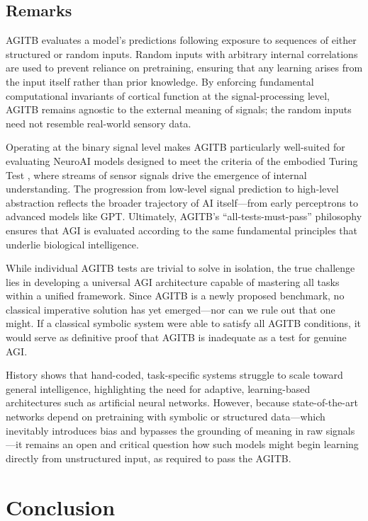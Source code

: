 \documentclass{article}
\begin{document}
\subsection{Remarks}

AGITB evaluates a model’s predictions following exposure to sequences of either structured or random inputs. Random inputs with arbitrary internal correlations are used to prevent reliance on pretraining, ensuring that any learning arises from the input itself rather than prior knowledge. By enforcing fundamental computational invariants of cortical function at the signal-processing level, AGITB remains agnostic to the external meaning of signals; the random inputs need not resemble real-world sensory data.

Operating at the binary signal level makes AGITB particularly well-suited for evaluating NeuroAI models designed to meet the criteria of the embodied Turing Test \cite{Zador2023}, where streams of sensor signals drive the emergence of internal understanding. The progression from low-level signal prediction to high-level abstraction reflects the broader trajectory of AI itself—from early perceptrons to advanced models like GPT. Ultimately, AGITB’s “all-tests-must-pass” philosophy ensures that AGI is evaluated according to the same fundamental principles that underlie biological intelligence.

While individual AGITB tests are trivial to solve in isolation, the true challenge lies in developing a universal AGI architecture capable of mastering all tasks within a unified framework. Since AGITB is a newly proposed benchmark, no classical imperative solution has yet emerged—nor can we rule out that one might. If a classical symbolic system were able to satisfy all AGITB conditions, it would serve as definitive proof that AGITB is inadequate as a test for genuine AGI.

History shows that hand-coded, task-specific systems struggle to scale toward general intelligence, highlighting the need for adaptive, learning-based architectures such as artificial neural networks. However, because state-of-the-art networks depend on pretraining with symbolic or structured data—which inevitably introduces bias and bypasses the grounding of meaning in raw signals—it remains an open and critical question how such models might begin learning directly from unstructured input, as required to pass the AGITB.

\section{Conclusion}
\end{document}
